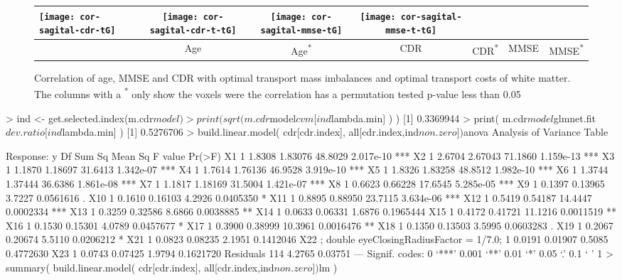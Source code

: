 \begin{figure}[bth]
\begin{tabular}{l|cc|cc|cc}
\texttt{[image: cor-sagital-cdr-tG]} &
\texttt{[image: cor-sagital-cdr-t-tG]} &
\texttt{[image: cor-sagital-mmse-tG]} &
\texttt{[image: cor-sagital-mmse-t-tG]} \\ \hline \hline
& \parbox[b][4mm]{6mm}{Age} 
& \parbox[b][4mm]{6mm}{Age\textsuperscript{*}} 
& \parbox[b][4mm]{6mm}{CDR} 
& \parbox[b][4mm]{6mm}{CDR\textsuperscript{*}}
& \parbox[b][4mm]{6mm}{MMSE}
& \parbox[b][4mm]{6mm}{MMSE\textsuperscript{*}}
\end{tabular}
\caption{\label{fig:cor-oasis-white}
Correlation of age, MMSE and CDR with optimal transport mass imbalances and
optimal transport costs of white matter. The columns with a \textsuperscript{*}
only show the voxels were the correlation has a permutation tested p-value less
than 0.05  }
\end{figure}
\endgroup


> ind <- get.selected.index(m.cdr$model)
> print( sqrt( m.cdr$model$cvm[ind$lambda.min] ) )
[1] 0.3369944
> print( m.cdr$model$glmnet.fit$dev.ratio[ind$lambda.min] )
[1] 0.5276706
> build.linear.model( cdr[cdr.index], all[cdr.index,ind$non.zero])$anova
Analysis of Variance Table

Response: y
           Df Sum Sq Mean Sq F value    Pr(>F)    
X1          1 1.8308 1.83076 48.8029 2.017e-10 ***
X2          1 2.6704 2.67043 71.1860 1.159e-13 ***
X3          1 1.1870 1.18697 31.6413 1.342e-07 ***
X4          1 1.7614 1.76136 46.9528 3.919e-10 ***
X5          1 1.8326 1.83258 48.8512 1.982e-10 ***
X6          1 1.3744 1.37444 36.6386 1.861e-08 ***
X7          1 1.1817 1.18169 31.5004 1.421e-07 ***
X8          1 0.6623 0.66228 17.6545 5.285e-05 ***
X9          1 0.1397 0.13965  3.7227 0.0561616 .  
X10         1 0.1610 0.16103  4.2926 0.0405350 *  
X11         1 0.8895 0.88950 23.7115 3.634e-06 ***
X12         1 0.5419 0.54187 14.4447 0.0002334 ***
X13         1 0.3259 0.32586  8.6866 0.0038885 ** 
X14         1 0.0633 0.06331  1.6876 0.1965444    
X15         1 0.4172 0.41721 11.1216 0.0011519 ** 
X16         1 0.1530 0.15301  4.0789 0.0457677 *  
X17         1 0.3900 0.38999 10.3961 0.0016476 ** 
X18         1 0.1350 0.13503  3.5995 0.0603283 .  
X19         1 0.2067 0.20674  5.5110 0.0206212 *  
X21         1 0.0823 0.08235  2.1951 0.1412046    
X22     ;
     double eyeClosingRadiusFactor =  1/7.0;
    1 0.0191 0.01907  0.5085 0.4772630    
X23         1 0.0743 0.07425  1.9794 0.1621720    
Residuals 114 4.2765 0.03751                      
---
Signif. codes:  0 ‘***’ 0.001 ‘**’ 0.01 ‘*’ 0.05 ‘.’ 0.1 ‘ ’ 1
> summary(  build.linear.model( cdr[cdr.index], all[cdr.index,ind$non.zero])$lm )


